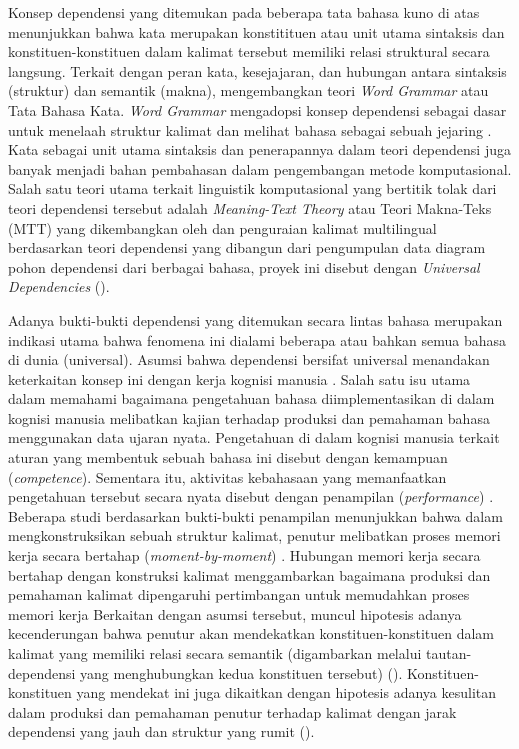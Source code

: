 Konsep dependensi yang ditemukan pada beberapa tata bahasa kuno di atas menunjukkan bahwa kata merupakan konstitituen atau unit utama sintaksis dan konstituen-konstituen dalam kalimat tersebut memiliki relasi struktural secara langsung. Terkait dengan peran kata, kesejajaran, dan hubungan antara sintaksis (struktur) dan semantik (makna), \citet{hudson1984word, hudson2007language} mengembangkan teori \textit{Word Grammar} atau Tata Bahasa Kata. \textit{Word Grammar} mengadopsi konsep dependensi sebagai dasar untuk menelaah struktur kalimat dan melihat bahasa sebagai sebuah jejaring \citep{hudson2007language}. Kata sebagai unit utama sintaksis dan penerapannya dalam teori dependensi juga banyak menjadi bahan pembahasan dalam pengembangan metode komputasional. Salah satu teori utama terkait linguistik komputasional yang bertitik tolak dari teori dependensi tersebut adalah \textit{Meaning-Text Theory} atau Teori Makna-Teks (MTT) yang dikembangkan oleh \cite{mel'vcuk1988dependency} dan penguraian kalimat multilingual berdasarkan teori dependensi yang dibangun dari pengumpulan data diagram pohon dependensi dari berbagai bahasa, proyek ini disebut dengan \textit{Universal Dependencies} (\citealp{mcdonald2013universal, nivre2016universal, nivre2017universal}). 

Adanya bukti-bukti dependensi yang ditemukan secara lintas bahasa merupakan indikasi utama bahwa fenomena ini dialami beberapa atau bahkan semua bahasa di dunia (universal). Asumsi bahwa dependensi bersifat universal menandakan keterkaitan konsep ini dengan kerja kognisi manusia \citep{gibson2000dependency}. Salah satu isu utama dalam memahami bagaimana pengetahuan bahasa diimplementasikan di dalam kognisi manusia melibatkan kajian terhadap produksi dan pemahaman bahasa menggunakan data ujaran nyata. Pengetahuan di dalam kognisi manusia terkait aturan yang membentuk sebuah bahasa ini disebut dengan kemampuan (\textit{competence}). Sementara itu, aktivitas kebahasaan yang memanfaatkan pengetahuan tersebut secara nyata disebut dengan penampilan (\textit{performance}) \citep{delahuntygarvey2010soundsense}. Beberapa studi berdasarkan bukti-bukti penampilan menunjukkan bahwa dalam mengkonstruksikan sebuah struktur kalimat, penutur melibatkan proses memori kerja secara bertahap (\textit{moment-by-moment}) \citep{gibson2000dependency}. Hubungan memori kerja secara bertahap dengan konstruksi kalimat menggambarkan bagaimana produksi dan pemahaman kalimat dipengaruhi pertimbangan untuk memudahkan proses memori kerja \citep{futrell2015large} Berkaitan dengan asumsi tersebut, muncul hipotesis adanya kecenderungan bahwa penutur akan mendekatkan konstituen-konstituen dalam kalimat yang memiliki relasi secara semantik (digambarkan melalui \gls{tautan-dependensi} yang menghubungkan kedua konstituen tersebut) (\citealp{futrell2015large, liu2017dependency}). Konstituen-konstituen yang mendekat ini juga dikaitkan dengan hipotesis adanya kesulitan dalam produksi dan pemahaman penutur terhadap kalimat dengan jarak dependensi yang jauh dan struktur yang rumit (\citealp{gibson2000dependency, dillon2011structured}).

